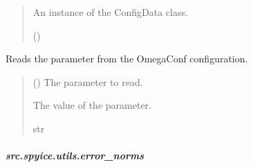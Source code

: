 \documentclass[a4paper,11pt,english,openany]{sphinxmanual}
\begin{document}
\begin{fulllineitems}
\begin{fulllineitems}
\begin{quote}
\begin{description}
\begin{itemize}
\end{itemize}

\sphinxAtStartPar
An instance of the ConfigData class.

\sphinxAtStartPar
{\hyperref[\detokenize{api/spyice.utils.config_sort:src.spyice.utils.config_sort.ConfigData}]{}} ()

\end{description}\end{quote}

\end{fulllineitems}


\end{fulllineitems}


\begin{fulllineitems}
\label{\detokenize{api/spyice.utils.config_sort:src.spyice.utils.config_sort.read_omegaconfig}}
\pysigstartsignatures
\pysiglinewithargsret
{}
{\sphinxparamcomma {}}
{}
\pysigstopsignatures
\sphinxAtStartPar
Reads the parameter from the OmegaConf configuration.
\begin{quote}\begin{description}
\sphinxAtStartPar
{} () \textendash{} The parameter to read.

\sphinxAtStartPar
The value of the parameter.

\sphinxAtStartPar
str

\sphinxAtStartPar
{} \textendash{} 

\end{description}\end{quote}

\end{fulllineitems}


\sphinxstepscope


\subparagraph{src.spyice.utils.error\_norms}
\label{\detokenize{api/spyice.utils.error_norms:module-src.spyice.utils.error_norms}}\label{\detokenize{api/spyice.utils.error_norms:src-spyice-utils-error-norms}}\label{\detokenize{api/spyice.utils.error_norms::doc}}
\end{document}
